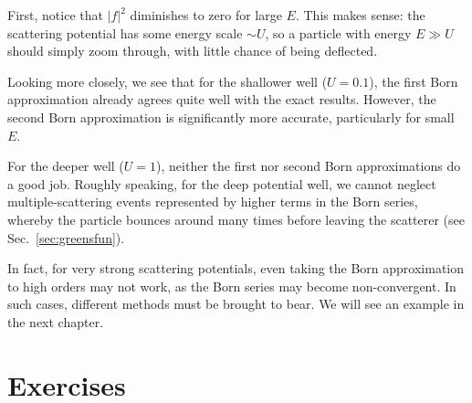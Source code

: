 \documentclass[prx,12pt]{revtex4-2}
\begin{document}
First, notice that $|f|^2$ diminishes to zero for large $E$.  This
makes sense: the scattering potential has some energy scale $\sim U$,
so a particle with energy $E \gg U$ should simply zoom through, with
little chance of being deflected.

Looking more closely, we see that for the shallower well ($U = 0.1$),
the first Born approximation already agrees quite well with the exact
results.  However, the second Born approximation is significantly more
accurate, particularly for small $E$.

For the deeper well ($U = 1$), neither the first nor second Born
approximations do a good job.  Roughly speaking, for the deep
potential well, we cannot neglect multiple-scattering events
represented by higher terms in the Born series, whereby the particle
bounces around many times before leaving the scatterer (see
Sec.~\ref{sec:greensfun}).

In fact, for very strong scattering potentials, even taking the Born
approximation to high orders may not work, as the Born series may
become non-convergent.  In such cases, different methods must be
brought to bear.  We will see an example in the next chapter.

\section*{Exercises}
\end{document}
